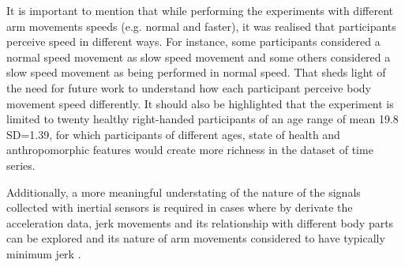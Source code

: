 It is important to mention that while performing the experiments 
with different arm movements speeds (e.g. normal and faster), it was 
realised that participants perceive speed in different ways.
For instance, some participants considered a normal speed movement 
as slow speed movement and some others considered a 
slow speed movement as being performed in normal speed. 
That sheds light of the need for future work to understand 
how each participant perceive body movement speed differently.
It should also be highlighted that the experiment is limited to twenty healthy 
right-handed participants of an age range of mean 19.8 SD=1.39, 
for which participants of different ages, state of health and anthropomorphic features
would create more richness in the dataset of time series.
%


Additionally, a more meaningful understating
of the nature of the signals collected with inertial sensors
is required in cases where by derivate the acceleration data,
jerk movements and its relationship with different 
body parts can be explored \cite{devries1982, mori2012} and its nature of 
arm movements considered to have typically minimum jerk \cite{flash1985}.
%
%




